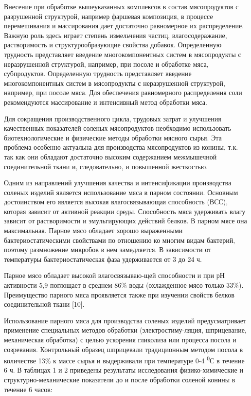 \begin{multicols}{2}
Внесение при обработке вышеуказанных комплексов в состав мясопродуктов с
разрушенной структурой, например фаршевая композиция, в процессе
перемешивания и массирования дает достаточно равномерное их
распределение. Важную роль здесь играет степень измельчения частиц,
влагосодеражание, растворимость и структурообразующие свойства добавок.
Определенную трудность представляет введение многокомпонентных систем в
мясопродукты с неразрушенной структурой, например, при посоле и
обработке мяса, субпродуктов. Определенную трудность представляет
введение многокомпонентных систем в мясопродукты с неразрушенной
структурой, например, при посоле мяса. Для обеспечения равномерного
распределения соли рекомендуются массирование и интенсивный метод
обработки мяса.

Для сокращения производственного цикла, трудовых затрат и улучшения
качественных показателей соленых мясопродуктов необходимо использовать
биотехнологические и физические методы обработки мясного сырья. Эта
проблема особенно актуальна для производства мясопродуктов из конины,
т.к. так как они обладают достаточно высоким содержанием межмышечной
соединительной ткани и, следовательно, и повышенной жесткостью.

Одним из направлений улучшения качества и интенсификации производства
соленых изделий является использование мяса в парном состоянии. Основным
достоинством его является высокая влагосвязывающая способность (ВСС),
которая зависит от активной реакции среды. Способность мяса удерживать
влагу зависит от растворимости и эмульгирующих действий белков. В парном
мясе она максимальная. Парное мясо обладает хорошо выраженными
бактериостатическими свойствами по отношению ко многим видам бактерий,
поэтому размножение микробов в нем замедляется. В зависимости от
температуры бактериостатическая фаза удерживается от 3 до 24 ч.

Парное мясо обладает высокой влагосвязываю-щей способности и при рН
активности 5,9 поглощает в среднем 86\% воды (охлажденное мясо только
33\%). Преимущество парного мяса проявляется также при изучении свойств
белков соединительной ткани {[}10{]}.

Использование парного мяса для производства соленых изделий
предусматривает применение специальных методов обработки
(электростиму-ляция, шприцевание, механическая обработка) с целью
ускорения гликолиза или процесса посола и созревания. Контрольный
образец шприцевали традиционным методом посола в количестве 13\% к массе
сырья и выдерживали при температуре 0-4 \textsuperscript{0}С в течение 6
ч. В таблицах 1 и 2 приведены результаты исследования физико-химические
и структурно-механические показатели до и после обработки соленой конины
в течение 6 часов:
\end{multicols}

